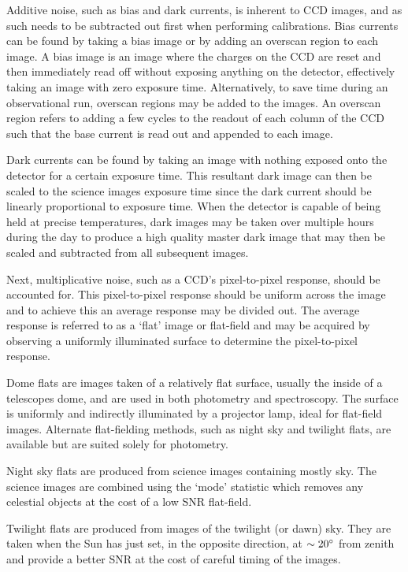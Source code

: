 Additive noise, such as bias and dark currents, is inherent to \gls{CCD} images, and as such needs to be subtracted out first when performing calibrations. Bias currents can be found by taking a bias image or by adding an overscan region to each image. A bias image is an image where the charges on the \gls{CCD} are reset and then immediately read off without exposing anything on the detector, effectively taking an image with zero exposure time. Alternatively, to save time during an observational run, overscan regions may be added to the images. An overscan region refers to adding a few cycles to the readout of each column of the \gls{CCD} such that the base current is read out and appended to each image.

Dark currents can be found by taking an image with nothing exposed onto the detector for a certain exposure time. This resultant dark image can then be scaled to the science images exposure time since the dark current should be linearly proportional to exposure time. When the detector is capable of being held at precise temperatures, dark images may be taken over multiple hours during the day to produce a high quality master dark image that may then be scaled and subtracted from all subsequent images.

Next, multiplicative noise, such as a \gls{CCD}'s pixel-to-pixel response, should be accounted for. This pixel-to-pixel response should be uniform across the image and to achieve this an average response may be divided out. The average response is referred to as a `flat' image or flat-field and may be acquired by observing a uniformly illuminated surface to determine the pixel-to-pixel response.

Dome flats are images taken of a relatively flat surface, usually the inside of a telescopes dome, and are used in both photometry and spectroscopy. The surface is uniformly and indirectly illuminated by a projector lamp, ideal for flat-field images. Alternate flat-fielding methods, such as night sky and twilight flats, are available but are suited solely for photometry.

Night sky flats are produced from science images containing mostly sky. The science images are combined using the `mode' statistic which removes any celestial objects at the cost of a low \gls{SNR} flat-field.

Twilight flats are produced from images of the twilight (or dawn) sky. They are taken when the Sun has just set, in the opposite direction, at $\sim 20\hbox{$^\circ$}$ from zenith and provide a better \gls{SNR} at the cost of careful timing of the images.

